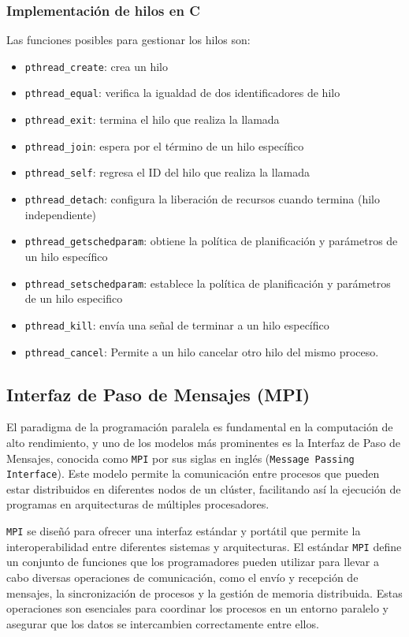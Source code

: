 \subsubsection{Implementación de hilos en C}

Las funciones posibles para gestionar los hilos son:

\begin{itemize}
	\item   \texttt{pthread\_create}: crea un hilo
	\item   \texttt{pthread\_equal}: verifica la igualdad de dos identificadores de hilo
	\item   \texttt{pthread\_exit}: termina el hilo que realiza la llamada
	\item   \texttt{pthread\_join}: espera por el término de un hilo específico
	\item   \texttt{pthread\_self}: regresa el ID del hilo que realiza la llamada
	\item   \texttt{pthread\_detach}: configura la liberación de recursos cuando termina (hilo independiente)
	\item   \texttt{pthread\_getschedparam}: obtiene la política de planificación y parámetros de un hilo específico
	\item   \texttt{pthread\_setschedparam}: establece la política de planificación y parámetros de un hilo especifico
	\item   \texttt{pthread\_kill}: envía una señal de terminar a un hilo específico
	\item   \texttt{pthread\_cancel}: Permite a un hilo cancelar otro hilo del mismo proceso.
\end{itemize} \cite*{man7-pthreads-no-date}

\subsection{Interfaz de Paso de Mensajes (MPI)}
El paradigma de la programación paralela es fundamental en la computación de alto rendimiento, y uno de los modelos más prominentes es la Interfaz de Paso de Mensajes, conocida como \texttt{MPI} por sus siglas en inglés (\texttt{Message Passing Interface}). Este modelo permite la comunicación entre procesos que pueden estar distribuidos en diferentes nodos de un clúster, facilitando así la ejecución de programas en arquitecturas de múltiples procesadores.\cite*{mit-press-mpi-reference-2024}

\texttt{MPI} se diseñó para ofrecer una interfaz estándar y portátil que permite la interoperabilidad entre diferentes sistemas y arquitecturas. El estándar \texttt{MPI} define un conjunto de funciones que los programadores pueden utilizar para llevar a cabo diversas operaciones de comunicación, como el envío y recepción de mensajes, la sincronización de procesos y la gestión de memoria distribuida. Estas operaciones son esenciales para coordinar los procesos en un entorno paralelo y asegurar que los datos se intercambien correctamente entre ellos.

